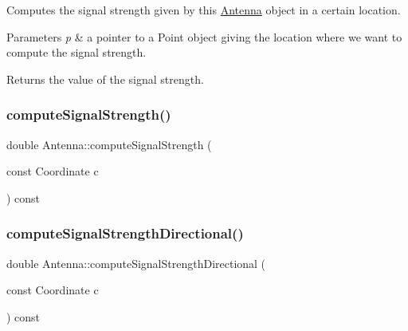 Computes the signal strength given by this \hyperlink{class_antenna}{Antenna} object in a certain location. 
\begin{DoxyParams}{Parameters}
{\em p} & a pointer to a Point object giving the location where we want to compute the signal strength. \\
\hline
\end{DoxyParams}
\begin{DoxyReturn}{Returns}
the value of the signal strength. 
\end{DoxyReturn}
\mbox{\label{class_antenna_ac33fe5654d4e3307a4c1c155b0f89128}} 
\subsubsection{\texorpdfstring{compute\+Signal\+Strength()}{computeSignalStrength()}\hspace{0.1cm}{\footnotesize\ttfamily [2/2]}}
{\footnotesize\ttfamily double Antenna\+::compute\+Signal\+Strength (\begin{DoxyParamCaption}\item[{const Coordinate}]{c }\end{DoxyParamCaption}) const\hspace{0.3cm}{\ttfamily [private]}}

\mbox{\label{class_antenna_a38bb70c5ca249773512186c34792b43a}} 
\subsubsection{\texorpdfstring{compute\+Signal\+Strength\+Directional()}{computeSignalStrengthDirectional()}}
{\footnotesize\ttfamily double Antenna\+::compute\+Signal\+Strength\+Directional (\begin{DoxyParamCaption}\item[{const Coordinate}]{c }\end{DoxyParamCaption}) const\hspace{0.3cm}{\ttfamily [private]}}

\mbox{\label{class_antenna_a26077f4061413733cedf9253ecc8686f}} 
